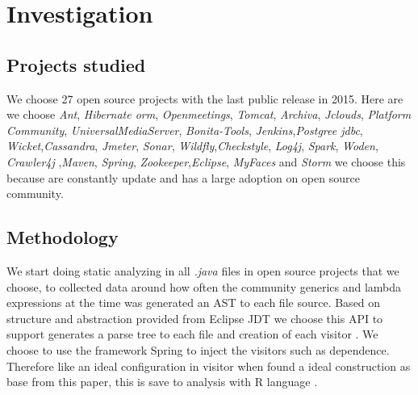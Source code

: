 \documentclass{sig-alternate-05-2015}
\begin{document}
\section{Investigation}

\subsection{Projects studied}

We choose 27 open source projects with the last public release in 2015. Here are we choose \textit{Ant}, \textit{Hibernate orm}, \textit{Openmeetings}, \textit{Tomcat}, \textit{Archiva}, \textit{Jclouds}, \textit{Platform Community}, \textit{UniversalMediaServer}, \textit{Bonita-Tools}, \textit{Jenkins},\textit{Postgree jdbc}, \textit{Wicket},\textit{Cassandra}, \textit{Jmeter}, \textit{Sonar}, \textit{Wildfly},\textit{Checkstyle}, \textit{Log4j}, \textit{Spark}, \textit{Woden}, \textit{Crawler4j} ,\textit{Maven}, \textit{Spring}, \textit{Zookeeper},\textit{Eclipse}, \textit{MyFaces} and \textit{Storm} we choose this because are constantly update and has a large adoption on open source community.\\ 





\subsection{Methodology}
We start doing static analyzing in all \textit{.java} files in open source projects that we choose, to collected data around how often the community generics and lambda expressions at the time was generated an AST to each file source. Based on structure and abstraction provided from Eclipse JDT we choose this API to support generates a parse tree to each file and creation of each visitor \cite{Gamma:1995:DPE:186897}. We choose to use the framework Spring to inject the visitors such as dependence. Therefore like an ideal configuration in visitor \cite{Gamma:1995:DPE:186897} when found a ideal construction as base from this paper, this is save to analysis with R language \cite{R}.\\
\end{document}
